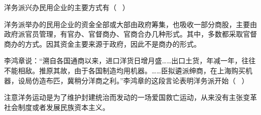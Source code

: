 \question 洋务派兴办民用企业的主要方式有（ ~）
\par{}
\begin{solution}洋务派举办的民用企业的资金全部或大部由政府筹集，也吸收一部分商股，主要由政府派官员管理，有官办、官督商办、官商合办几种形式。其中，多数都采取官督商办的方式。因其资金主要来源于政府，因此不是商办的形式。
\end{solution}
\question 李鸿章说：``溯自各国通商以来，进口洋货日增月盛\ldots{}\ldots{}出口土货，年减一年，往往不能相敌。推原其故，由于各国制造均用机器。\ldots{}\ldots{}臣拟遴派绅商，在上海购买机器，设局仿造布匹，冀稍分洋商之利。''李鸿章的这段言论表明洋务派开始（
~）
\par{}
\begin{solution}注意洋务运动是为了维护封建统治而发动的一场爱国救亡运动，从来没有主张变革社会制度或者发展民族资本主义。
\end{solution}
